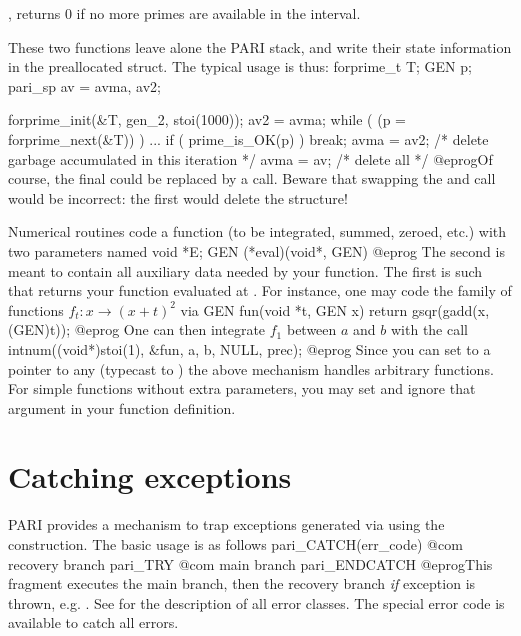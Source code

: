 , returns $0$ if no more primes
are available in the interval.

These two functions leave alone the PARI stack, and write their state
information in the preallocated  struct. The typical usage is
thus:
\bprog
  forprime_t T;
  GEN p;
  pari_sp av = avma, av2;

  forprime_init(&T, gen_2, stoi(1000));
  av2 = avma;
  while ( (p = forprime_next(&T)) )
  {
    ...
    if ( prime_is_OK(p) ) break;
    avma = av2; /* delete garbage accumulated in this iteration */
  }
  avma = av; /* delete all */
@eprog\noindent Of course, the final  could be replaced
by a  call. Beware that swapping the
 and  call would be incorrect: the
first  would delete the  structure!


Numerical routines code a function (to be integrated, summed, zeroed, etc.)
with two parameters named
\bprog
  void *E;
  GEN (*eval)(void*, GEN)
@eprog\noindent
The second is meant to contain all auxiliary data needed by your function.
The first is such that  returns your function evaluated at
. For instance, one may code the family of functions
$f_t: x \to (x+t)^2$ via
\bprog
GEN fun(void *t, GEN x) { return gsqr(gadd(x, (GEN)t)); }
@eprog\noindent
One can then integrate $f_1$ between $a$ and $b$ with the call
\bprog
intnum((void*)stoi(1), &fun, a, b, NULL, prec);
@eprog\noindent
Since you can set  to a pointer to any  (typecast to
) the above mechanism handles arbitrary functions. For simple
functions without extra parameters, you may set  and ignore
that argument in your function definition.

\section{Catching exceptions}


PARI provides a mechanism to trap exceptions generated via 
using the  construction. The basic usage is as follows
\bprog
 pari_CATCH(err_code) {
   @com recovery branch
 }
 pari_TRY {
   @com main branch
 }
 pari_ENDCATCH
@eprog\noindent This fragment executes the main branch, then the recovery
branch \emph{if} exception  is thrown, e.g. .
See  for the description of all error classes.
The special error code  is available to catch all errors.

